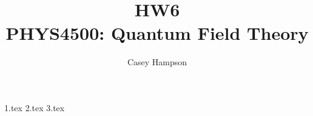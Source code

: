 \documentclass[titlepage]{article}
\title{HW6 \\[5pt] PHYS4500: Quantum Field Theory}
\author{Casey Hampson}
\begin{document}
    \maketitle
    \pagebreak

    {1.tex}
    {2.tex} 
    {3.tex} 
\end{document}
